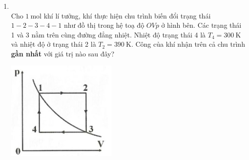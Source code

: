 \begin{enumerate}[label=\bfseries Câu \arabic*:, leftmargin=1.7cm]
\item {}\\
Cho $\SI{1}{\mole}$ khí lí tưởng, khí thực hiện chu trình biến đổi trạng thái  $1-2-3-4-1$ như đồ thị trong hệ toạ độ $OVp$ ở hình bên. Các trạng thái 1 và 3 nằm trên cùng đường đẳng nhiệt. Nhiệt độ trạng thái 4 là $T_4=\SI{300}{\kelvin}$ và nhiệt độ ở trạng thái 2 là $T_2=\SI{390}{\kelvin}$. Công của khí nhận trên cả chu trình \textbf{gần nhất} với giá trị nào sau đây?
\begin{center}
	\includegraphics[width=0.3\linewidth]{../figs/VN12-Y24-PH-SYL-015P-5}
\end{center}
\end{enumerate}

